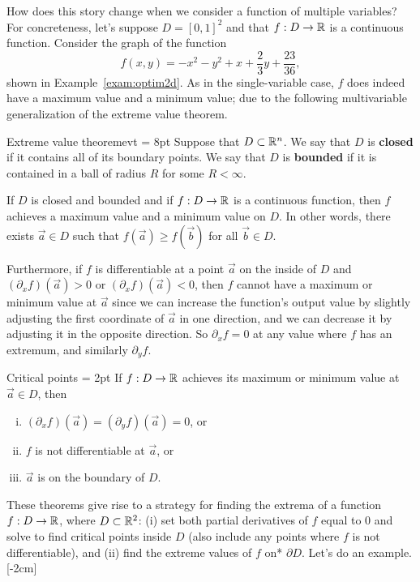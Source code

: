 \documentclass{watsonbook}
\begin{document}
How does this story change when we consider a function of multiple
variables? For concreteness, let's suppose $D = [0,1]^2$ and that
$f:D \to \mathbb{R}$ is a continuous function. Consider the graph of the
function
  \[
    f(x,y) = -x^2 - y^2 + x + \frac{2}{3} y + \frac{23}{36}, 
  \]
  shown in Example~\ref{exam:optim2d}. As in the single-variable case,
  $f$ does indeed have a maximum value and a minimum value; due to the
  following multivariable generalization of the extreme value
  theorem. 

  \begin{theo}{Extreme value theorem}{evt} \parskip = 8pt 
    Suppose that $D \subset \mathbb{R}^n$. We say that $D$ is \textbf{closed}
    if it contains all of its boundary points. We say that $D$ is
    \textbf{bounded} if it is contained in a ball of radius $R$ for
    some $R<\infty$.

    If $D$ is closed and bounded and if $f:D \to \mathbb{R}$ is a continuous
    function, then $f$ achieves a maximum value and a minimum value on
    $D$. In other words, there exists $\vec{a} \in D$ such that
    $f(\vec{a}) \geq f(\vec{b})$ for all $\vec{b} \in D$. 
  \end{theo}

  Furthermore, if $f$ is differentiable at a point $\vec{a}$ on the
  inside of $D$ and $(\partial_x f)(\vec{a}) >0$ or
  $(\partial_x f)(\vec{a}) <0$, then $f$ cannot have a maximum or
  minimum value at $\vec{a}$ since we can increase the function's
  output value by slightly adjusting the first coordinate of
  $\vec{a}$ in one direction, and we can decrease it by adjusting
  it in the opposite direction. So $\partial_x f = 0$ at any value
  where $f$ has an extremum, and similarly $\partial _y f$. 

  \begin{theo}{Critical points}{} \parskip = 2pt
    If $f:D \to \mathbb{R}$ achieves its maximum or minimum value at
    $\vec{a} \in D$, then
    \begin{enumerate}[(i),itemsep=4pt]
    \item $(\partial_x f)(\vec{a})= (\partial_yf)(\vec{a}) =
      0$, or 
    \item $f$ is not differentiable at $\vec{a}$, or
    \item $\vec{a}$ is on the boundary of $D$. 
    \end{enumerate}
  \end{theo}
  
  These theorems give rise to a strategy for finding the extrema of a
  function $f:D \to \mathbb{R}$, where $D \subset \mathbb{R}^2$: (i) set both partial
  derivatives of $f$ equal to 0 and solve to find critical points
  inside $D$ (also include any points where $f$ is not
  differentiable), and (ii) find the extreme values of $f$ on*
  $\partial D$. Let's do an example. [-2cm]
\end{document}
